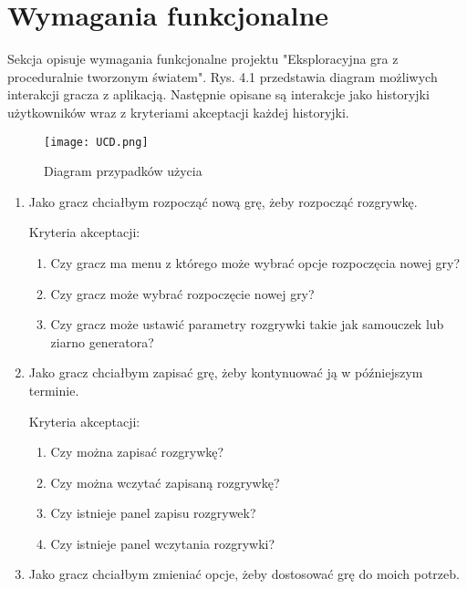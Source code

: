\section{Wymagania funkcjonalne}
Sekcja opisuje wymagania funkcjonalne projektu "Eksploracyjna gra z proceduralnie tworzonym światem". Rys. 4.1 przedstawia diagram możliwych interakcji gracza z aplikacją. Następnie opisane są interakcje jako historyjki użytkowników wraz z kryteriami akceptacji każdej historyjki.

\begin{figure}[H]
    \centering
        \caption{Diagram przypadków użycia}
        \texttt{[image: UCD.png]}
\end{figure}

\begin{enumerate}
    \item Jako gracz chciałbym rozpocząć nową grę, żeby rozpocząć rozgrywkę.
    
        Kryteria akceptacji:
        \begin{enumerate}
            \item Czy gracz ma menu z którego może wybrać opcje rozpoczęcia nowej gry?
            \item Czy gracz może wybrać rozpoczęcie nowej gry?
            \item Czy gracz może ustawić parametry rozgrywki takie jak samouczek lub ziarno generatora?
        \end{enumerate}
    
    \item Jako gracz chciałbym zapisać grę, żeby kontynuować ją w późniejszym terminie.
    
        Kryteria akceptacji:
        \begin{enumerate}
            \item Czy można zapisać rozgrywkę?
            \item Czy można wczytać zapisaną rozgrywkę?
            \item Czy istnieje panel zapisu rozgrywek?
            \item Czy istnieje panel wczytania rozgrywki?
        \end{enumerate}
    
    \item Jako gracz chciałbym zmieniać opcje, żeby dostosować grę do moich potrzeb.
    

\end{enumerate}
